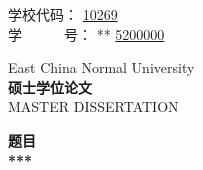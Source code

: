 \pagestyle{empty}


\hskip 4.6cm {{ 学校代码： {\large  \underline{10269\hspace{1.4cm}}}}}\\
\hskip 4.6cm  {{ 学~~~~~~号： {\large \ifpeerview ***\hspace{1.82cm} \else \underline{5200000}\fi}}}

\vskip 2cm

\begin{center}
\end{center}

\begin{center}
{  East China Normal University} \\
{\bf\songti{} 硕士学位论文} \\
{  MASTER DISSERTATION}
\end{center}

\vskip 1.5cm

\begin{center}
{\bf\songti{} 题目}\\[1em]
{\bf\songti{} ***}
\end{center}

